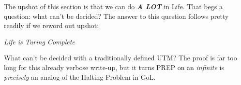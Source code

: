 \documentclass{article}
\theoremstyle{definition}
\theoremstyle{plain}
\theoremstyle{plain}
\begin{document}
The upshot of this section is that we can do \textbf{\textit{A LOT}} in Life. That begs a question: what can't be decided? The answer to this question follows pretty readily if we reword out upshot:

\begin{center}
  \textit{Life is Turing Complete}
\end{center}

What can't be decided with a traditionally defined UTM? The proof is far too long for this already verbose write-up, but it turns PREP on an \textit{infinite} is \textit{precisely} an analog of the Halting Problem in GoL.

\printbibliography
\end{document}
